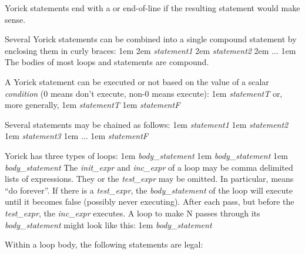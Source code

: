 
Yorick statements end with a \kbd{;} or end-of-line if the resulting
statement would make sense.

Several Yorick statements can be combined into a single compound
statement by enclosing them in curly braces:
\begindemo
\hglue1em \kbd{\{}
\hglue2em {\it statement1}
\hglue2em {\it statement2}
\hglue2em ...
\hglue1em \kbd{\}}
\enddemo
The bodies of most loops and  statements are compound.


A Yorick statement can be executed or not based on the value of a
scalar {\it condition} (0 means don't execute, non-0 means execute):
\begindemo
\hglue1em \kbd{)} {\it statementT}
\enddemo
or, more generally,
\begindemo
\hglue1em \kbd{)} {\it statementT}
\hglue1em  {\it statementF}
\enddemo

Several  statements may be chained as follows:
\begindemo
\hglue1em \kbd{)} {\it statement1}
\hglue1em \kbd{)} {\it statement2}
\hglue1em \kbd{)} {\it statement3}
\hglue1em ...
\hglue1em  {\it statementF}
\enddemo


Yorick has three types of loops:
\begindemo
\hglue1em\kbd{)} {\it body\_statement}
\hglue1em {\it body\_statement\/} \kbd{)}
\hglue1em\kbd{)} {\it body\_statement}
\enddemo
The {\it init\_expr} and {\it inc\_expr} of a  loop may be comma
delimited lists of expressions.  They or the {\it test\_expr} may be
omitted.  In particular,  means ``do forever''.  If
there is a {\it test\_expr}, the {\it body\_statement} of the  loop
will execute until it becomes false (possibly never executing).  After
each pass, but before the {\it test\_expr}, the {\it inc\_expr} executes.
A  loop to make N passes through its {\it body\_statement} might
look like this: \hfil\break
\hglue1em {\it body\_statement}


Within a loop body, the following statements are legal:


